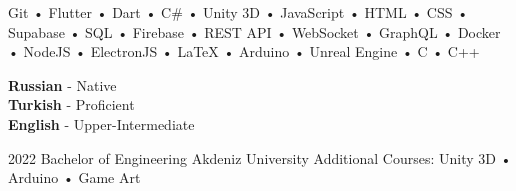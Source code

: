 \documentclass[9pt]{developercv} %
\begin{document}
\vspace{0.5cm}


\begin{minipage}[t]{0.65\textwidth}
    \vspace{-\baselineskip} %


    Git •
    Flutter •
    Dart •
    C\# •
    Unity 3D •
    JavaScript •
    HTML •
    CSS •
    Supabase •
    SQL •
    Firebase •
    REST API •
    WebSocket •
    GraphQL •
    Docker •
    NodeJS •
    ElectronJS •
    LaTeX •
    Arduino •
    Unreal Engine •
    C •
    C++
\end{minipage}
\hfill
\begin{minipage}[t]{0.3\textwidth}
    \vspace{-\baselineskip} %


    \textbf{Russian} - Native\\
    \textbf{Turkish} - Proficient\\
    \textbf{English} - Upper-Intermediate
\end{minipage}



\begin{entrylist}
    \entry
    {2022}
    {Bachelor of Engineering}
    {Akdeniz University}
    {Additional Courses: Unity 3D • Arduino • Game Art}
\end{entrylist}


\end{document}
